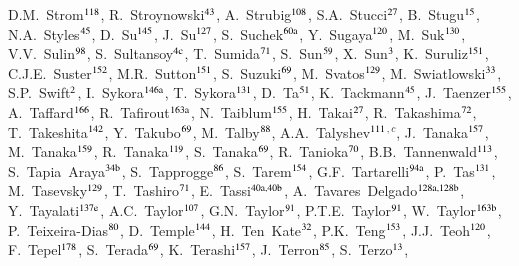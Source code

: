 \begin{flushleft}
D.M.~Strom$^\textrm{\scriptsize 118}$,
R.~Stroynowski$^\textrm{\scriptsize 43}$,
A.~Strubig$^\textrm{\scriptsize 108}$,
S.A.~Stucci$^\textrm{\scriptsize 27}$,
B.~Stugu$^\textrm{\scriptsize 15}$,
N.A.~Styles$^\textrm{\scriptsize 45}$,
D.~Su$^\textrm{\scriptsize 145}$,
J.~Su$^\textrm{\scriptsize 127}$,
S.~Suchek$^\textrm{\scriptsize 60a}$,
Y.~Sugaya$^\textrm{\scriptsize 120}$,
M.~Suk$^\textrm{\scriptsize 130}$,
V.V.~Sulin$^\textrm{\scriptsize 98}$,
S.~Sultansoy$^\textrm{\scriptsize 4c}$,
T.~Sumida$^\textrm{\scriptsize 71}$,
S.~Sun$^\textrm{\scriptsize 59}$,
X.~Sun$^\textrm{\scriptsize 3}$,
K.~Suruliz$^\textrm{\scriptsize 151}$,
C.J.E.~Suster$^\textrm{\scriptsize 152}$,
M.R.~Sutton$^\textrm{\scriptsize 151}$,
S.~Suzuki$^\textrm{\scriptsize 69}$,
M.~Svatos$^\textrm{\scriptsize 129}$,
M.~Swiatlowski$^\textrm{\scriptsize 33}$,
S.P.~Swift$^\textrm{\scriptsize 2}$,
I.~Sykora$^\textrm{\scriptsize 146a}$,
T.~Sykora$^\textrm{\scriptsize 131}$,
D.~Ta$^\textrm{\scriptsize 51}$,
K.~Tackmann$^\textrm{\scriptsize 45}$,
J.~Taenzer$^\textrm{\scriptsize 155}$,
A.~Taffard$^\textrm{\scriptsize 166}$,
R.~Tafirout$^\textrm{\scriptsize 163a}$,
N.~Taiblum$^\textrm{\scriptsize 155}$,
H.~Takai$^\textrm{\scriptsize 27}$,
R.~Takashima$^\textrm{\scriptsize 72}$,
T.~Takeshita$^\textrm{\scriptsize 142}$,
Y.~Takubo$^\textrm{\scriptsize 69}$,
M.~Talby$^\textrm{\scriptsize 88}$,
A.A.~Talyshev$^\textrm{\scriptsize 111}$$^{,c}$,
J.~Tanaka$^\textrm{\scriptsize 157}$,
M.~Tanaka$^\textrm{\scriptsize 159}$,
R.~Tanaka$^\textrm{\scriptsize 119}$,
S.~Tanaka$^\textrm{\scriptsize 69}$,
R.~Tanioka$^\textrm{\scriptsize 70}$,
B.B.~Tannenwald$^\textrm{\scriptsize 113}$,
S.~Tapia~Araya$^\textrm{\scriptsize 34b}$,
S.~Tapprogge$^\textrm{\scriptsize 86}$,
S.~Tarem$^\textrm{\scriptsize 154}$,
G.F.~Tartarelli$^\textrm{\scriptsize 94a}$,
P.~Tas$^\textrm{\scriptsize 131}$,
M.~Tasevsky$^\textrm{\scriptsize 129}$,
T.~Tashiro$^\textrm{\scriptsize 71}$,
E.~Tassi$^\textrm{\scriptsize 40a,40b}$,
A.~Tavares~Delgado$^\textrm{\scriptsize 128a,128b}$,
Y.~Tayalati$^\textrm{\scriptsize 137e}$,
A.C.~Taylor$^\textrm{\scriptsize 107}$,
G.N.~Taylor$^\textrm{\scriptsize 91}$,
P.T.E.~Taylor$^\textrm{\scriptsize 91}$,
W.~Taylor$^\textrm{\scriptsize 163b}$,
P.~Teixeira-Dias$^\textrm{\scriptsize 80}$,
D.~Temple$^\textrm{\scriptsize 144}$,
H.~Ten~Kate$^\textrm{\scriptsize 32}$,
P.K.~Teng$^\textrm{\scriptsize 153}$,
J.J.~Teoh$^\textrm{\scriptsize 120}$,
F.~Tepel$^\textrm{\scriptsize 178}$,
S.~Terada$^\textrm{\scriptsize 69}$,
K.~Terashi$^\textrm{\scriptsize 157}$,
J.~Terron$^\textrm{\scriptsize 85}$,
S.~Terzo$^\textrm{\scriptsize 13}$,
$$
\end{flushleft}
